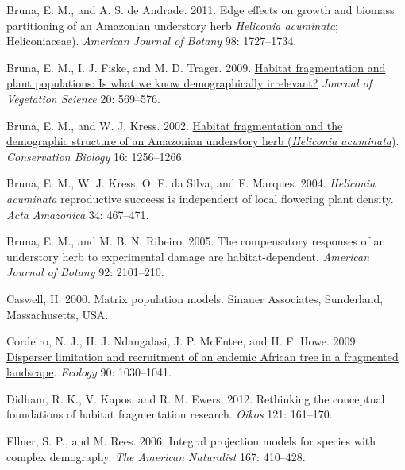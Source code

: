 \documentclass[
  12pt,
  man, donotrepeattitle]{apa6}
\newlength{\cslhangindent}
\newlength{\cslentryspacingunit} %
\newenvironment{CSLReferences}[2] %
 {%
  \setlength{\parindent}{0pt}
  \ifodd #1
  \let\oldpar\par
  \def\par{\hangindent=\cslhangindent\oldpar}
  \fi
  \setlength{\parskip}{#2\cslentryspacingunit}
 }%
 {}
\begin{document}
\begin{CSLReferences}{1}{0}
\leavevmode{}%
Bruna, E. M., and A. S. de Andrade. 2011. Edge effects on growth and biomass partitioning of an {Amazonian} understory herb \emph{{Heliconia} acuminata}; {Heliconiaceae}). \emph{American Journal of Botany} 98: 1727--1734.

\leavevmode{}%
Bruna, E. M., I. J. Fiske, and M. D. Trager. 2009. \href{https://doi.org/10.1111/j.1654-1103.2009.01060.x}{Habitat fragmentation and plant populations: Is what we know demographically irrelevant?} \emph{Journal of Vegetation Science} 20: 569--576.

\leavevmode{}%
Bruna, E. M., and W. J. Kress. 2002. \href{https://doi.org/10.1046/j.1523-1739.2002.99494.x}{Habitat fragmentation and the demographic structure of an {Amazonian} understory herb (\emph{{Heliconia} acuminata})}. \emph{Conservation Biology} 16: 1256--1266.

\leavevmode{}%
Bruna, E. M., W. J. Kress, O. F. da Silva, and F. Marques. 2004. \emph{{Heliconia} acuminata} reproductive succeess is independent of local flowering plant density. \emph{Acta Amazonica} 34: 467--471.

\leavevmode{}%
Bruna, E. M., and M. B. N. Ribeiro. 2005. The compensatory responses of an understory herb to experimental damage are habitat-dependent. \emph{American Journal of Botany} 92: 2101--210.

\leavevmode{}%
Caswell, H. 2000. Matrix population models. Sinauer Associates, Sunderland, Massachusetts, USA.

\leavevmode{}%
Cordeiro, N. J., H. J. Ndangalasi, J. P. McEntee, and H. F. Howe. 2009. \href{https://doi.org/10.1890/07-1208.1}{Disperser limitation and recruitment of an endemic {African} tree in a fragmented landscape}. \emph{Ecology} 90: 1030--1041.

\leavevmode{}%
Didham, R. K., V. Kapos, and R. M. Ewers. 2012. Rethinking the conceptual foundations of habitat fragmentation research. \emph{Oikos} 121: 161--170.

\leavevmode{}%
Ellner, S. P., and M. Rees. 2006. Integral projection models for species with complex demography. \emph{The American Naturalist} 167: 410--428.


\end{CSLReferences}
\end{document}
